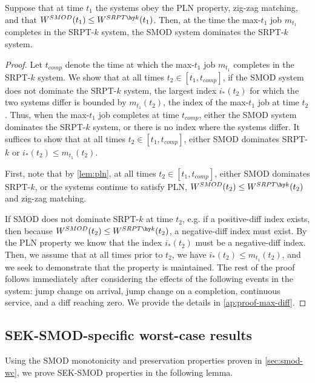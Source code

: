 \documentclass[acmsmall]{acmart}
\begin{document}
\begin{lemma}
    \label{lem:max-diff}
    Suppose that at time $t_1$ the systems obey the PLN property, zig-zag matching,
    and that $W^{SMOD}(t_1) \le W^{SRPT\hy k}(t_1)$.
    Then, at the time the max-$t_1$ job $m_{t_1}$ completes in the SRPT-$k$ system,
    the SMOD system dominates the SRPT-$k$ system.
\end{lemma}
\begin{proof}
    Let $t_{comp}$ denote the time at which the max-$t_1$ job $m_{t_1}$ completes in the SRPT-$k$ system. We show that at all times $t_2 \in [t_1, t_{comp}]$,
    if the SMOD system does not dominate the SRPT-$k$ system,
    the largest index $i_*(t_2)$ for which the two systems differ is bounded by
    $m_{t_1}(t_2)$, the index of the max-$t_1$ job at time $t_2$.
    Thus, when the max-$t_1$ job completes at time $t_{comp}$,
    either the SMOD system dominates the SRPT-$k$ system,
    or there is no index where the systems differ. 
    It suffices to show that at all times $t_2 \in [t_1, t_{comp}]$, either SMOD dominates SRPT-$k$
    or $i_*(t_2) \le m_{t_1}(t_2)$.
    
    First, note that by \cref{lem:pln},
    at all times $t_2 \in [t_1, t_{comp}]$, either SMOD dominates SRPT-$k$, or
    the systems continue to satisfy PLN, $W^{SMOD}(t_2)\le W^{SRPT\hy k}(t_2)$ and zig-zag matching.
    
    If SMOD does not dominate SRPT-$k$ at time $t_2$,
    e.g. if a positive-diff index exists,
    then because $W^{SMOD}(t_2) \le W^{SRPT\hy k}(t_2)$,
    a negative-diff index must exist.
    By the PLN property
    we know that the index $i_*(t_2)$
    must be a negative-diff index. Then, we assume that at all times prior to $t_2$, we have $i_*(t_2) \le m_{t_1}(t_2)$,
    and we seek to demonstrate that the property is maintained. The rest of the proof follows immediately after considering the effects of the following events in the system: jump change on arrival, jump change on a completion, continuous service, and a diff reaching zero. We provide the details in \cref{ap:proof-max-diff}.
\end{proof}




\subsection{SEK-SMOD-specific worst-case results}
\label{sec:sek-smod-wc}

Using the SMOD monotonicity and preservation properties proven in \cref{sec:smod-wc}, we prove SEK-SMOD properties in the following lemma.
\end{document}
